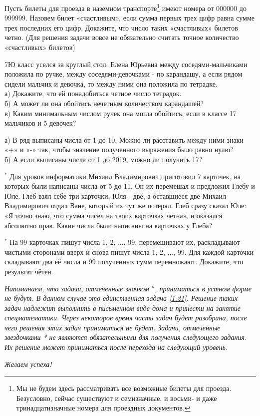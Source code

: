 \begin{thm}
	Пусть билеты для проезда в наземном транспорте\footnote{Мы не будем здесь рассматривать все возможные билеты для проезда. Безусловно, сейчас существуют и семизначные, и восьми- и даже тринадцатизначные номера для проездных документов.}  имеют номера от 000000 до 999999. Назовем билет «счастливым», если сумма первых трех цифр равна сумме трех последних его цифр. Докажите, что число таких «счастливых» билетов четно. (Для решения задачи вовсе не обязательно считать точное количество «счастливых» билетов)
\end{thm}

\begin{thm}
	7Ю класс уселся за круглый стол. Елена Юрьевна между соседями-мальчиками положила по ручке, между соседями-девочками - по карандашу, а если рядом сидели мальчик и девочка, то между ними она положила по тетрадке.\\
	а) Докажите, что ей понадобиться четное число тетрадок.\\
	б) А может ли она обойтись нечетным количеством карандашей?\\
	в) Каким минимальным числом ручек она могла обойтись, если в классе 17 мальчиков и 5 девочек?
\end{thm}

\begin{thm}\label{an1.3}
	а) В ряд выписаны числа от 1 до 10. Можно ли расставить между ними знаки «+» и «-» так, чтобы значение полученного выражения было равно нулю?\\ б) А если выписаны числа от 1 до 2019, можно ли получить 17?
\end{thm}

\begin{thm}$^\ast$
	Для уроков информатики Михаил Владимирович приготовил 7 карточек, на которых были написаны числа от 5 до 11. Он их перемешал и предложил Глебу и Юле. Глеб взял себе три карточки, Юля - две, а оставшиеся две Михаил Владимирович отдал Ване, который их тут же потерял. Глеб сразу сказал Юле: «Я точно знаю, что сумма чисел на твоих карточках четна», и оказался абсолютно прав. Какие числа были написаны на карточках у Глеба?
\end{thm}

\begin{thm}$^\ast$ \label{1.30} На 99 карточках пишут числа 1, 2, ..., 99, перемешивают их, раскладывают чистыми сторонами вверх и снова пишут числа 1, 2, ..., 99. Для каждой карточки складывают два её числа и 99 полученных сумм перемножают. Докажите, что результат чётен.
\end{thm}
\textit{ Напоминаем, что задачи, отмеченные значком ${}^{ n}$, приниматься в устном форме не будут. В данном случае это единственная задача \ref{1.21}. Решение таких задач надлежит выполнить в письменном виде дома и принести на занятие спецматематики. Через некоторое время часть задач будет разобрана, после чего решения этих задач приниматься не будет. Задачи, отмеченные звездочками * не являются обязательными для получения следующего задания. Их решение может приниматься после перехода на следующий уровень.}     
\begin{flushright}
	\textit{Желаем успеха!}
\end{flushright}
\newpage
